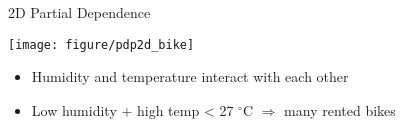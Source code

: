 \documentclass[11pt,compress,t,notes=noshow, aspectratio=169, xcolor=table]{beamer}
\begin{document}
\begin{frame}{2D Partial Dependence}

\begin{center}
\texttt{[image: figure/pdp2d\_bike]}
\end{center}

\begin{itemize}
 \item Humidity and temperature interact with each other
 \item Low humidity + high temp < 27 $^{\circ}$C $\Rightarrow$ many rented bikes
\end{itemize}


%

\end{frame}

\endlecture
\end{document}
